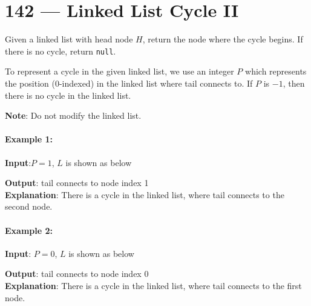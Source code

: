 \section{142 --- Linked List Cycle II}
Given a linked list with head node $H$, return the node where the cycle begins. If there is no cycle, return \texttt{null}.
\par
To represent a cycle in the given linked list, we use an integer $P$ which represents the position (0-indexed) in the linked list where tail connects to. If $P$ is $-1$, then there is no cycle in the linked list.
\par
\textbf{Note}: Do not modify the linked list.
\paragraph{Example 1:}
\begin{flushleft}
\textbf{Input}:$P = 1$, $L$ is shown as below
\begin{figure}[H]
\end{figure}
\textbf{Output}: tail connects to node index 1
\\
\textbf{Explanation}: There is a cycle in the linked list, where tail connects to the second node.
\end{flushleft}
\paragraph{Example 2:}
\begin{flushleft}
\textbf{Input}: $P=0$, $L$ is shown as below
\begin{figure}[H]
\end{figure}
\textbf{Output}: tail connects to node index 0
\\
\textbf{Explanation}: There is a cycle in the linked list, where tail connects to the first node.
\end{flushleft}
